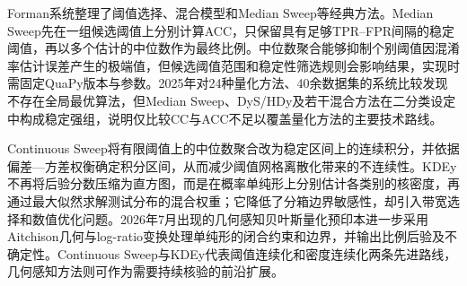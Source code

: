 \documentclass[
  chinese,
  12pt,
  a4paper,
  chinese,
  UTF8]{ctexart}
\begin{document}
Forman系统整理了阈值选择、混合模型和Median
Sweep等经典方法\autocite{forman2008quantification}。Median
Sweep先在一组候选阈值上分别计算ACC，只保留具有足够TPR--FPR间隔的稳定阈值，再以多个估计的中位数作为最终比例。中位数聚合能够抑制个别阈值因混淆率估计误差产生的极端值，但候选阈值范围和稳定性筛选规则会影响结果，实现时需固定QuaPy版本与参数\autocite{moreo2021quapy}。2025年对24种量化方法、40余数据集的系统比较发现不存在全局最优算法，但Median
Sweep、DyS/HDy及若干混合方法在二分类设定中构成稳定强组\autocite{schumacher2025comparison}，说明仅比较CC与ACC不足以覆盖量化方法的主要技术路线。

Continuous
Sweep将有限阈值上的中位数聚合改为稳定区间上的连续积分，并依据偏差---方差权衡确定积分区间，从而减少阈值网格离散化带来的不连续性\autocite{kloos2026continuous}。KDEy不再将后验分数压缩为直方图，而是在概率单纯形上分别估计各类别的核密度，再通过最大似然求解测试分布的混合权重\autocite{moreo2025kdey}；它降低了分箱边界敏感性，却引入带宽选择和数值优化问题。2026年7月出现的几何感知贝叶斯量化预印本进一步采用Aitchison几何与log-ratio变换处理单纯形的闭合约束和边界，并输出比例后验及不确定性\autocite{moreo2026geometry}。Continuous
Sweep与KDEy代表阈值连续化和密度连续化两条先进路线，几何感知方法则可作为需要持续核验的前沿扩展。
\end{document}
